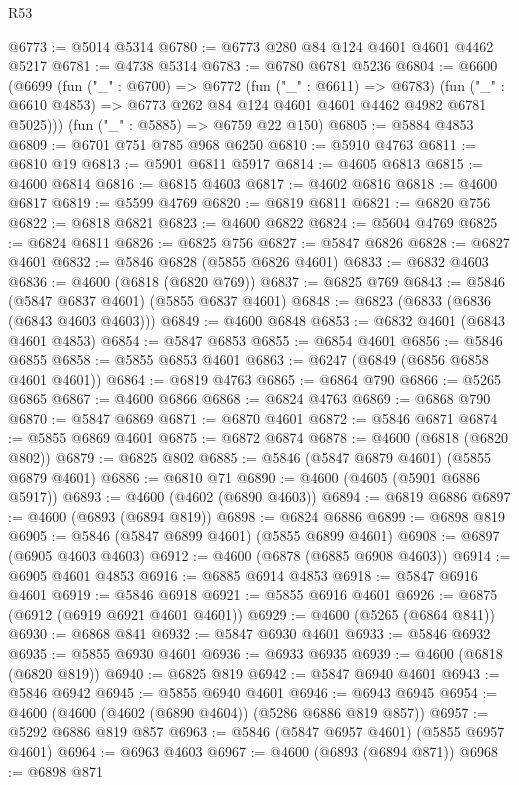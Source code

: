 \begin{lexlean}{R53}
\begin{coremodule}
@6773 := @5014 @5314
@6780 := @6773 @280 @84 @124 @4601 @4601 @4462 @5217
@6781 := @4738 @5314
@6783 := @6780 @6781 @5236
@6804 := @6600
    (@6699
      (fun ("_" : @6700) =>
      @6772
        (fun ("_" : @6611) => @6783)
        (fun ("_" : @6610 @4853) => @6773 @262 @84 @124 @4601 @4601 @4462 @4982 @6781 @5025)))
    (fun ("_" : @5885) => @6759 @22 @150)
@6805 := @5884 @4853
@6809 := @6701 @751 @785 @968 @6250
@6810 := @5910 @4763
@6811 := @6810 @19
@6813 := @5901 @6811 @5917
@6814 := @4605 @6813
@6815 := @4600 @6814
@6816 := @6815 @4603
@6817 := @4602 @6816
@6818 := @4600 @6817
@6819 := @5599 @4769
@6820 := @6819 @6811
@6821 := @6820 @756
@6822 := @6818 @6821
@6823 := @4600 @6822
@6824 := @5604 @4769
@6825 := @6824 @6811
@6826 := @6825 @756
@6827 := @5847 @6826
@6828 := @6827 @4601
@6832 := @5846 @6828 (@5855 @6826 @4601)
@6833 := @6832 @4603
@6836 := @4600 (@6818 (@6820 @769))
@6837 := @6825 @769
@6843 := @5846 (@5847 @6837 @4601) (@5855 @6837 @4601)
@6848 := @6823 (@6833 (@6836 (@6843 @4603 @4603)))
@6849 := @4600 @6848
@6853 := @6832 @4601 (@6843 @4601 @4853)
@6854 := @5847 @6853
@6855 := @6854 @4601
@6856 := @5846 @6855
@6858 := @5855 @6853 @4601
@6863 := @6247 (@6849 (@6856 @6858 @4601 @4601))
@6864 := @6819 @4763
@6865 := @6864 @790
@6866 := @5265 @6865
@6867 := @4600 @6866
@6868 := @6824 @4763
@6869 := @6868 @790
@6870 := @5847 @6869
@6871 := @6870 @4601
@6872 := @5846 @6871
@6874 := @5855 @6869 @4601
@6875 := @6872 @6874
@6878 := @4600 (@6818 (@6820 @802))
@6879 := @6825 @802
@6885 := @5846 (@5847 @6879 @4601) (@5855 @6879 @4601)
@6886 := @6810 @71
@6890 := @4600 (@4605 (@5901 @6886 @5917))
@6893 := @4600 (@4602 (@6890 @4603))
@6894 := @6819 @6886
@6897 := @4600 (@6893 (@6894 @819))
@6898 := @6824 @6886
@6899 := @6898 @819
@6905 := @5846 (@5847 @6899 @4601) (@5855 @6899 @4601)
@6908 := @6897 (@6905 @4603 @4603)
@6912 := @4600 (@6878 (@6885 @6908 @4603))
@6914 := @6905 @4601 @4853
@6916 := @6885 @6914 @4853
@6918 := @5847 @6916 @4601
@6919 := @5846 @6918
@6921 := @5855 @6916 @4601
@6926 := @6875 (@6912 (@6919 @6921 @4601 @4601))
@6929 := @4600 (@5265 (@6864 @841))
@6930 := @6868 @841
@6932 := @5847 @6930 @4601
@6933 := @5846 @6932
@6935 := @5855 @6930 @4601
@6936 := @6933 @6935
@6939 := @4600 (@6818 (@6820 @819))
@6940 := @6825 @819
@6942 := @5847 @6940 @4601
@6943 := @5846 @6942
@6945 := @5855 @6940 @4601
@6946 := @6943 @6945
@6954 := @4600 (@4600 (@4602 (@6890 @4604)) (@5286 @6886 @819 @857))
@6957 := @5292 @6886 @819 @857
@6963 := @5846 (@5847 @6957 @4601) (@5855 @6957 @4601)
@6964 := @6963 @4603
@6967 := @4600 (@6893 (@6894 @871))
@6968 := @6898 @871

\end{coremodule}
\end{lexlean}
